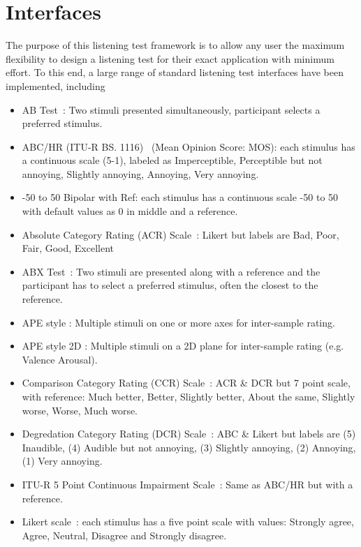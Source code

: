 \documentclass{sig-alternate}
\begin{document}
	
\section{Interfaces} %
\label{sec:interfaces}

The purpose of this listening test framework is to allow any user the maximum flexibility to design a listening test for their exact application with minimum effort. To this end, a large range of standard listening test interfaces have been implemented, including 
	\begin{itemize}[noitemsep,nolistsep]
		\item AB Test~\cite{lipshitz1981great}: Two stimuli presented simultaneously, participant selects a preferred stimulus.
		\item ABC/HR (ITU-R BS. 1116)~\cite{recommendation19971116} (Mean Opinion Score: MOS): each stimulus has a continuous scale (5-1), labeled as Imperceptible, Perceptible but not annoying, Slightly annoying, Annoying, Very annoying.
		\item -50 to 50 Bipolar with Ref: each stimulus has a continuous scale -50 to 50 with default values as 0 in middle and a reference.
		\item Absolute Category Rating (ACR) Scale~\cite{rec1996p}: Likert but labels are Bad, Poor, Fair, Good, Excellent
		\item ABX Test~\cite{clark1982high}: Two stimuli are presented along with a reference and the participant has to select a preferred stimulus, often the closest to the reference.
		\item APE style \cite{ape}: Multiple stimuli on one or more axes for inter-sample rating.
		\item APE style 2D \cite{ape}: Multiple stimuli on a 2D plane for inter-sample rating (e.g. Valence Arousal).
		\item Comparison Category Rating (CCR) Scale~\cite{rec1996p}: ACR \& DCR but 7 point scale, with reference: Much better, Better, Slightly better, About the same, Slightly worse, Worse, Much worse. 
		\item Degredation Category Rating (DCR) Scale~\cite{rec1996p}: ABC \& Likert but labels are (5) Inaudible, (4) Audible but not annoying, (3) Slightly annoying, (2) Annoying, (1) Very annoying.
		\item ITU-R 5 Point Continuous Impairment Scale~\cite{rec1997bs}: Same as ABC/HR but with a reference.
		\item Likert scale~\cite{likert1932technique}: each stimulus has a five point scale with values: Strongly agree, Agree, Neutral, Disagree and Strongly disagree.

\end{itemize}
\end{document}
